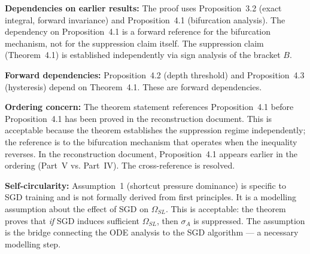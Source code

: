 \begin{circularity-check}
\textbf{Dependencies on earlier results:} The proof uses
Proposition~3.2 (exact integral, forward invariance) and
Proposition~4.1 (bifurcation analysis). The dependency on
Proposition~4.1 is a forward reference for the bifurcation
mechanism, not for the suppression claim itself. The suppression
claim (Theorem~4.1) is established independently via sign analysis
of the bracket $B$.

\textbf{Forward dependencies:} Proposition~4.2 (depth threshold)
and Proposition~4.3 (hysteresis) depend on Theorem~4.1. These are
forward dependencies.

\textbf{Ordering concern:} The theorem statement references
Proposition~4.1 before Proposition~4.1 has been proved in the
reconstruction document. This is acceptable because the theorem
establishes the suppression regime independently; the reference
is to the bifurcation mechanism that operates when the inequality
reverses. In the reconstruction document, Proposition~4.1 appears
earlier in the ordering (Part~V vs. Part~IV). The cross-reference
is resolved.

\textbf{Self-circularity:} Assumption~1 (shortcut pressure dominance)
is specific to SGD training and is not formally derived from first
principles. It is a modelling assumption about the effect of SGD on
$\Omega_{SL}$. This is acceptable: the theorem proves that \emph{if}
SGD induces sufficient $\Omega_{SL}$, then $\sigma_A$ is suppressed.
The assumption is the bridge connecting the ODE analysis to the
SGD algorithm — a necessary modelling step.
\end{circularity-check}
